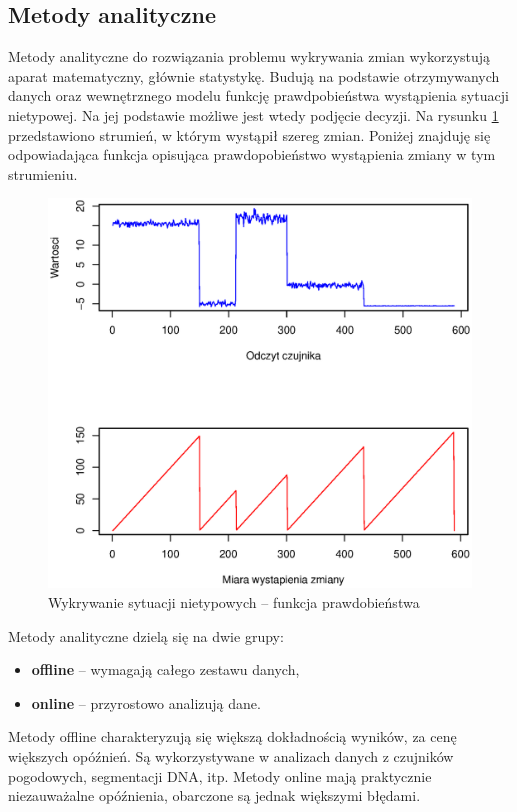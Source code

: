 \newpage
\subsection{Metody analityczne}

Metody analityczne do rozwiązania problemu wykrywania zmian wykorzystują aparat matematyczny,
głównie statystykę.
Budują na podstawie otrzymywanych danych
oraz wewnętrznego modelu funkcję prawdpobieństwa wystąpienia sytuacji nietypowej.
Na jej podstawie możliwe jest wtedy podjęcie decyzji.
Na rysunku \ref{fig:SignalAnalytics} przedstawiono strumień,
w którym wystąpił szereg zmian.
Poniżej znajduję się odpowiadająca funkcja opisująca prawdopobieństwo wystąpienia zmiany w tym strumieniu.
\begin{figure}[htbp]
\centering
	\includegraphics[width=1\textwidth]{img/ch-2-change}
	\caption{Wykrywanie sytuacji nietypowych -- funkcja prawdobieństwa}
  \label{fig:SignalAnalytics}
\end{figure}

Metody analityczne dzielą się na dwie grupy:
\begin{itemize}
  \item \textbf{offline} -- wymagają całego zestawu danych,
  \item \textbf{online} -- przyrostowo analizują dane.
\end{itemize}
Metody offline charakteryzują się większą dokładnością wyników,
za cenę większych opóźnień.
Są wykorzystywane w analizach danych z czujników pogodowych, segmentacji DNA, itp.
Metody online mają praktycznie niezauważalne opóźnienia,
obarczone są jednak większymi błędami.
